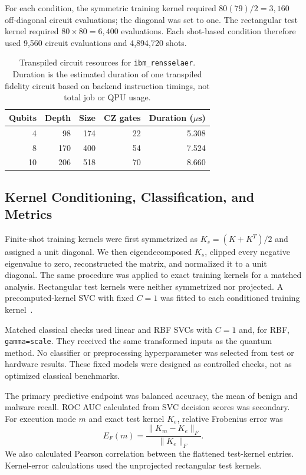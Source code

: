\documentclass[letterpaper]{article} %
\begin{document}
For each condition, the symmetric training kernel required $80(79)/2=3,160$ off-diagonal circuit evaluations; the diagonal was set to one. The rectangular test kernel required $80\times80=6,400$ evaluations. Each shot-based condition therefore used 9,560 circuit evaluations and 4,894,720 shots.

\begin{table}[t]
  \centering
  \small
  \caption{Transpiled circuit resources for \texttt{ibm\_rensselaer}. Duration is the estimated duration of one transpiled fidelity circuit based on backend instruction timings, not total job or QPU usage.}
  \label{tab:circuit-resources}
  \begin{tabular}{rrrrr}
  \toprule
  Qubits & Depth & Size & CZ gates & Duration ($\mu$s) \\
  \midrule
  4  & 98  & 174 & 22 & 5.308 \\
  8  & 170 & 400 & 54 & 7.524 \\
  10 & 206 & 518 & 70 & 8.660 \\
  \bottomrule
  \end{tabular}
\end{table}

\subsection{Kernel Conditioning, Classification, and Metrics}

Finite-shot training kernels were first symmetrized as $K_s=(K+K^{T})/2$ and assigned a unit diagonal. We then eigendecomposed $K_s$, clipped every negative eigenvalue to zero, reconstructed the matrix, and normalized it to a unit diagonal. The same procedure was applied to exact training kernels for a matched analysis. Rectangular test kernels were neither symmetrized nor projected. A precomputed-kernel SVC with fixed $C=1$ was fitted to each conditioned training kernel~\cite{scholkopf2002,qiskit2024}.

Matched classical checks used linear and RBF SVCs with $C=1$ and, for RBF, \texttt{gamma=scale}. They received the same transformed inputs as the quantum method. No classifier or preprocessing hyperparameter was selected from test or hardware results. These fixed models were designed as controlled checks, not as optimized classical benchmarks.

The primary predictive endpoint was balanced accuracy, the mean of benign and malware recall. ROC AUC calculated from SVC decision scores was secondary. For execution mode $m$ and exact test kernel $K_e$, relative Frobenius error was
\begin{equation}
E_F(m)=\frac{\|K_m-K_e\|_F}{\|K_e\|_F}.
\label{eq:relative-frobenius}
\end{equation}
We also calculated Pearson correlation between the flattened test-kernel entries. Kernel-error calculations used the unprojected rectangular test kernels.
\end{document}
